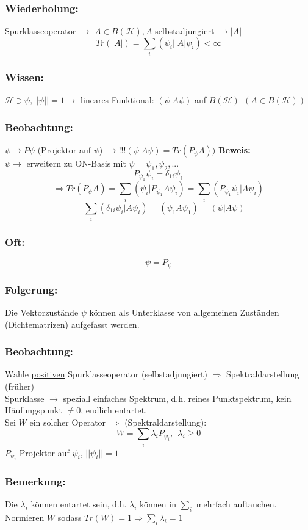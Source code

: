 \documentclass[twoside,a4paper]{scrartcl}
\renewcommand{\1}{\mathds{1}}
\newcommand{\Ra}{\Rightarrow}
\newcommand{\ra}{\rightarrow}
\renewcommand{\l}{\lambda}
\renewcommand{\H}{\mathcal{H}}
\begin{document}
\subsubsection*{Wiederholung:}
Spurklasseoperator $\ra$ $A\in B(\H), A $ selbstadjungiert $\ra |A|$\\
$$Tr(|A|)=\sum_i (\psi_i||A|\psi_i)< \infty$$
\subsubsection*{Wissen:}
$\H \ni \psi, ||\psi||=1 \ra$ lineares Funktional: $(\psi|A\psi)$ auf $B(\H)\ \ (A\in B(\H))$
\subsubsection*{Beobachtung:}
$\psi \ra P\psi$ (Projektor auf $\psi$) $\ra !!! (\psi|A\psi)=Tr(P_\psi A))$
\textbf{Beweis:}\\
$\psi \ra$ erweitern zu ON-Basis mit $\psi=\psi_1, \psi_2,...$ \\
$$P_{\psi_1}\psi_i=\delta_{1i}\psi_1$$
$$\Ra Tr(P_\psi A)=\sum_i (\psi_i|P_{\psi_1}A\psi_i)=\sum_i (P_{\psi_1}\psi_i|A\psi_i)$$
$$=\sum_i (\delta_{1i}\psi_i|A\psi_i)=(\psi_1A\psi_1)=(\psi|A\psi)$$
\subsubsection*{Oft:}
$$\psi=P_\psi$$
\subsubsection*{Folgerung:}
Die Vektorzustände $\psi$ können als Unterklasse von allgemeinen Zuständen (Dichtematrizen) aufgefasst werden.
\subsubsection*{Beobachtung:}
Wähle \underline{positiven} Spurklasseoperator (selbstadjungiert) $\Ra$ Spektraldarstellung (früher)\\
Spurklasse $\ra$ speziall einfaches Spektrum, d.h. reines Punktspektrum, kein Häufungspunkt $\neq 0$, endlich entartet.\\
Sei $W$ ein solcher Operator $\Ra$ (Spektraldarstellung):\\
$$W=\sum_i \l_i P_{\psi_i}, \ \ \l_i\geq 0$$
$P_{\psi_i}$ Projektor auf $\psi_i$, $||\psi_i||=1$
\subsubsection*{Bemerkung:}
Die $\l_i$ können entartet sein, d.h. $\l_i$ können in $\sum_i$ mehrfach auftauchen. Normieren $W$ sodass $Tr(W)=1 \Ra \sum_i \l_i=1$
\end{document}
